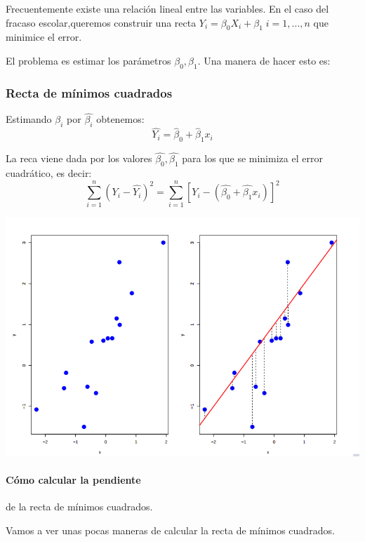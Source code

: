 Frecuentemente existe una relación lineal entre las variables. En el caso del fracaso escolar,queremos construir una recta $Y_i = β_0 X_i + β_1\; i=1,...,n$ que minimice el error.

El problema es estimar los parámetros $β_0,β_1$. Una manera de hacer esto es:

\subsubsection{Recta de mínimos cuadrados}

\begin{defn}
Estimando $β_i$ por $\hat{β_i}$ obtenemos: \[\hat{Y_i} = \hat{β}_0 + \hat{β}_1 x_i\]

La reca viene dada por los valores $\hat{β_0}, \hat{β_1}$ para los que se minimiza el error cuadrático, es decir:
\[\sum_{i=1}^n \left(Y_i - \hat{Y_i}\right)^2 =  \sum_{i=1}^n \left[ Y_i - (\hat{β_0} + \hat{β_1}x_i) \right]^2\]
\end{defn}

\begin{example}
\begin{center}
\includegraphics[scale=0.6]{img/ejemploRectaRegresionLineal.png}
\end{center}
\end{example}

\paragraph{Cómo calcular la pendiente} de la recta de mínimos cuadrados.


Vamos a ver unas pocas maneras de calcular la recta de mínimos cuadrados.

